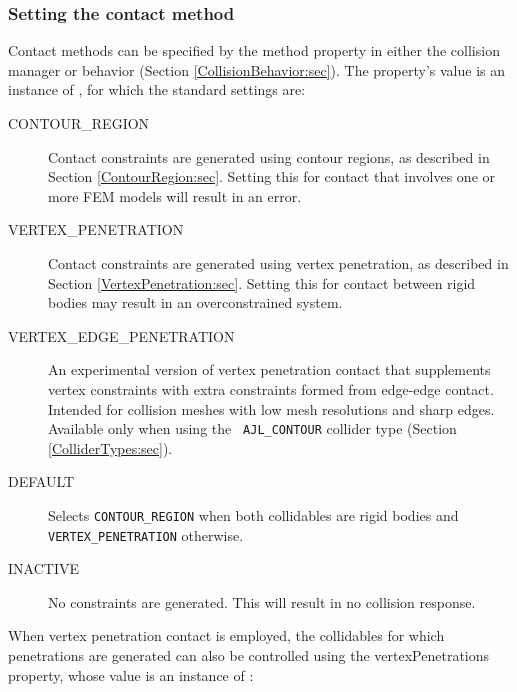 \subsubsection{Setting the contact method}
\label{SettingContactMethod:sec}

Contact methods can be specified by the {\sf method} property in
either the collision manager or behavior (Section
\ref{CollisionBehavior:sec}).  The property's value is an instance of
, for
which the standard settings are:

\begin{description}

\item[CONTOUR\_REGION]\mbox{}

Contact constraints are generated using contour regions, as described
in Section \ref{ContourRegion:sec}. Setting this for contact that
involves one or more FEM models will result in an error.

\item[VERTEX\_PENETRATION]\mbox{}

Contact constraints are generated using vertex penetration, as
described in Section \ref{VertexPenetration:sec}. Setting this for
contact between rigid bodies may result in an overconstrained system.

\item[VERTEX\_EDGE\_PENETRATION]\mbox{}

An experimental version of vertex penetration contact that
supplements vertex constraints with extra constraints formed from
edge-edge contact. Intended for collision meshes with low mesh
resolutions and sharp edges. Available only when using the {\tt
AJL\_CONTOUR} collider type (Section
\ref{ColliderTypes:sec}).

\item[DEFAULT]\mbox{}

Selects {\tt CONTOUR\_REGION} when both collidables are rigid bodies
and {\tt VERTEX\_PENETRATION} otherwise.

\item[INACTIVE]\mbox{}

No constraints are generated. This will result in no collision
response.

\end{description}

When vertex penetration contact is employed, the collidables for which
penetrations are generated can also be controlled using the {\sf
vertexPenetrations} property, whose value is an instance of
:

